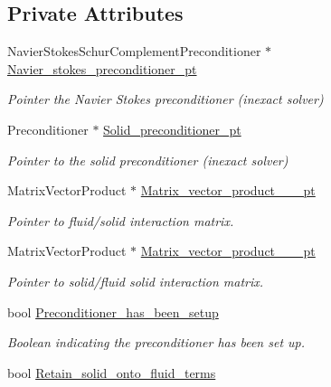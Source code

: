 \subsection*{Private Attributes}
\begin{DoxyCompactItemize}
\item 
Navier\+Stokes\+Schur\+Complement\+Preconditioner $\ast$ \hyperlink{classoomph_1_1FSIPreconditioner_adc98903b78d0bc97c40eb733eaf6e498}{Navier\+\_\+stokes\+\_\+preconditioner\+\_\+pt}
\begin{DoxyCompactList}\small\item\em Pointer the Navier Stokes preconditioner (inexact solver) \end{DoxyCompactList}\item 
Preconditioner $\ast$ \hyperlink{classoomph_1_1FSIPreconditioner_a9a6616d03bd67e2c1c406bcb6d332893}{Solid\+\_\+preconditioner\+\_\+pt}
\begin{DoxyCompactList}\small\item\em Pointer to the solid preconditioner (inexact solver) \end{DoxyCompactList}\item 
Matrix\+Vector\+Product $\ast$ \hyperlink{classoomph_1_1FSIPreconditioner_a595acfea83abd9fd907c208f3b487f57}{Matrix\+\_\+vector\+\_\+product\+\_\+\_\+\_\+pt}
\begin{DoxyCompactList}\small\item\em Pointer to fluid/solid interaction matrix. \end{DoxyCompactList}\item 
Matrix\+Vector\+Product $\ast$ \hyperlink{classoomph_1_1FSIPreconditioner_a8b4161c521cb4160ae07bb0096eaca1c}{Matrix\+\_\+vector\+\_\+product\+\_\+\_\+\_\+pt}
\begin{DoxyCompactList}\small\item\em Pointer to solid/fluid solid interaction matrix. \end{DoxyCompactList}\item 
bool \hyperlink{classoomph_1_1FSIPreconditioner_ad8d4b031c62a4ec74fad432a6bf27346}{Preconditioner\+\_\+has\+\_\+been\+\_\+setup}
\begin{DoxyCompactList}\small\item\em Boolean indicating the preconditioner has been set up. \end{DoxyCompactList}\item 
bool \hyperlink{classoomph_1_1FSIPreconditioner_acecba46494b0aa6f2035020f53be634c}{Retain\+\_\+solid\+\_\+onto\+\_\+fluid\+\_\+terms}

\end{DoxyCompactItemize}
